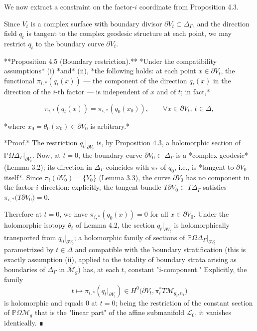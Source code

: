 We now extract a constraint on the factor-$i$ coordinate from Proposition 4.3.

Since $V_t$ is a complex surface with boundary divisor $\partial V_t \subset \Delta_\Gamma$, and the direction field $q_t$ is tangent to the complex geodesic structure at each point, we may restrict $q_t$ to the boundary curve $\partial V_t$.

**Proposition 4.5 (Boundary restriction).** *Under the compatibility assumptions* (i) *and* (ii), *the following holds: at each point $x \in \partial V_t$, the functional $\pi_{i,*}(q_t(x))$ — the component of the direction $q_t(x)$ in the direction of the $i$-th factor — is independent of $x$ and of $t$; in fact,*

$$\pi_{i,*}(q_t(x)) = \pi_{i,*}(q_0(x_0)), \qquad \forall x \in \partial V_t, \ t \in \Delta,$$

*where $x_0 = \theta_0(x_0) \in \partial V_0$ is arbitrary.*

*Proof.* The restriction $q_t|_{\partial V_t}$ is, by Proposition 4.3, a holomorphic section of $\mathbb{P}\Omega \Delta_\Gamma |_{\partial V_t}$. Now, at $t = 0$, the boundary curve $\partial V_0 \subset \Delta_\Gamma$ is a *complex geodesic* (Lemma 3.2); its direction in $\Delta_\Gamma$ coincides with $\pi_*$ of $q_0$, i.e., is *tangent to $\partial V_0$ itself*. Since $\pi_i(\partial V_0) = \{Y_0\}$ (Lemma 3.3), the curve $\partial V_0$ has no component in the factor-$i$ direction: explicitly, the tangent bundle $T \partial V_0 \subset T \Delta_\Gamma$ satisfies $\pi_{i,*}\bigl(T \partial V_0\bigr) = 0$.

Therefore at $t = 0$, we have $\pi_{i,*}(q_0(x)) = 0$ for all $x \in \partial V_0$. Under the holomorphic isotopy $\theta_t$ of Lemma 4.2, the section $q_t|_{\partial V_t}$ is holomorphically transported from $q_0|_{\partial V_0}$; a holomorphic family of sections of $\mathbb{P}\Omega \Delta_\Gamma |_{\partial V_t}$ parametrized by $t \in \Delta$ and compatible with the boundary stratification (this is exactly assumption (ii), applied to the totality of boundary strata arising as boundaries of $\Delta_\Gamma$ in $\overline{\mathcal{M}}_g$) has, at each $t$, constant "$i$-component." Explicitly, the family
$$t \mapsto \pi_{i,*}(q_t|_{\partial V_t}) \in H^0\bigl(\partial V_t, \pi_i^* T\mathcal{M}_{g_i,n_i}\bigr)$$
is holomorphic and equals $0$ at $t = 0$; being the restriction of the constant section of $\mathbb{P}\Omega \mathcal{M}_g$ that is the "linear part" of the affine submanifold $\mathcal{L}_0$, it vanishes identically. ∎

